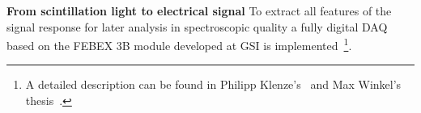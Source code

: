 \textbf{From scintillation light to electrical signal}\newline
To extract all features of the signal response for later analysis in spectroscopic quality a fully digital DAQ based on the FEBEX 3B module developed at GSI is implemented~\footnote{A detailed description can be found in Philipp Klenze's~\cite{pklenze} and Max Winkel's thesis~\cite{winkel2016komplexe}.}. 

